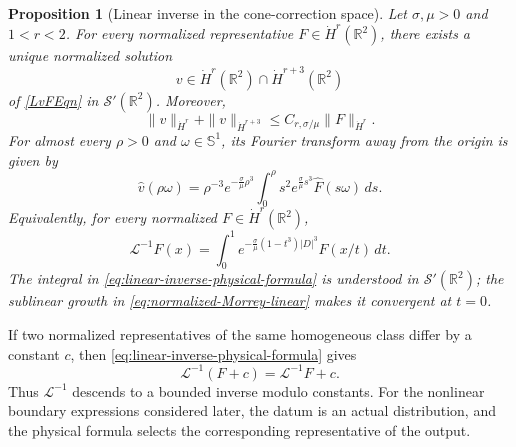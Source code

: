 \documentclass[12pt]{amsart}
\newtheorem{proposition}[theorem]{Proposition}
\theoremstyle{remark}
\theoremstyle{definition}
\numberwithin{equation}{section}
\newcommand{\R}{\mathbb{R}}
\begin{document}
\begin{proposition}[Linear inverse in the cone-correction space]
\label{prop:linear-inverse-Sobolev}
Let \(\sigma,\mu>0\) and \(1<r<2\).
For every normalized representative \(F\in\dot H^r(\R^2)\), there exists a unique normalized solution
\[
 v\in\dot H^r(\R^2)\cap\dot H^{r+3}(\R^2)
\]
of \eqref{LvFEqn} in \(\mathcal S'(\R^2)\).
Moreover,
\begin{equation}
\label{eq:linear-inverse-Sobolev}
 \|v\|_{\dot H^r} + \|v\|_{\dot H^{r+3}} \leq C_{r,\sigma/\mu}\|F\|_{\dot H^r}.
\end{equation}
For almost every \(\rho>0\) and \(\omega\in\mathbb S^1\), its Fourier transform away from the origin is given by
\begin{equation}
\label{eq:linear-inverse-ray-formula}
 \widehat v(\rho\omega) = \rho^{-3}e^{-\frac{\sigma}{\mu}\rho^3} \int_0^\rho s^2e^{\frac{\sigma}{\mu}s^3}\widehat F(s\omega)\,ds.
\end{equation}
Equivalently, for every normalized \(F\in\dot H^r(\R^2)\),
\begin{equation}
\label{eq:linear-inverse-physical-formula}
 \mathcal L^{-1}F(x) = \int_0^1 e^{-\frac{\sigma}{\mu}(1-t^3)|D|^3}F(x/t)\,dt.
\end{equation}
The integral in \eqref{eq:linear-inverse-physical-formula} is understood in \(\mathcal S'(\R^2)\); the sublinear growth in \eqref{eq:normalized-Morrey-linear} makes it convergent at \(t=0\).
\end{proposition}

If two normalized representatives of the same homogeneous class differ by
a constant \(c\), then \eqref{eq:linear-inverse-physical-formula} gives
\[
 \mathcal L^{-1}(F+c)=\mathcal L^{-1}F+c.
\]
Thus \(\mathcal L^{-1}\) descends to a bounded inverse modulo constants.
For the nonlinear boundary expressions considered later, the datum is an
actual distribution, and the physical formula selects the corresponding
representative of the output.
\end{document}
